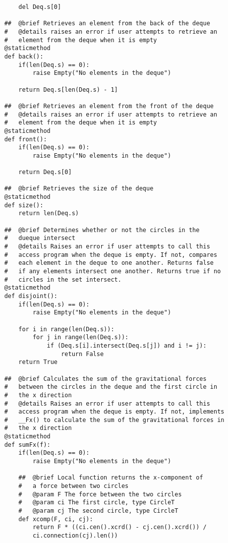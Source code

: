 \documentclass{article}
\begin{document}
\begin{lstlisting}
        del Deq.s[0]
        
    ##  @brief Retrieves an element from the back of the deque
    #   @details raises an error if user attempts to retrieve an  
    #   element from the deque when it is empty
    @staticmethod
    def back():
        if(len(Deq.s) == 0):
            raise Empty("No elements in the deque")
        
        return Deq.s[len(Deq.s) - 1]

    ##  @brief Retrieves an element from the front of the deque
    #   @details raises an error if user attempts to retrieve an  
    #   element from the deque when it is empty
    @staticmethod
    def front():
        if(len(Deq.s) == 0):
            raise Empty("No elements in the deque")
        
        return Deq.s[0]
    
    ##  @brief Retrieves the size of the deque
    @staticmethod
    def size():
        return len(Deq.s)
        
    ##  @brief Determines whether or not the circles in the 
    #   dueque intersect
    #   @details Raises an error if user attempts to call this 
    #   access program when the deque is empty. If not, compares
    #   each element in the deque to one another. Returns false 
    #   if any elements intersect one another. Returns true if no 
    #   circles in the set intersect.
    @staticmethod
    def disjoint():
        if(len(Deq.s) == 0):
            raise Empty("No elements in the deque")

        for i in range(len(Deq.s)):
            for j in range(len(Deq.s)):
                if (Deq.s[i].intersect(Deq.s[j]) and i != j):
                    return False
        return True

    ##  @brief Calculates the sum of the gravitational forces 
    #   between the circles in the deque and the first circle in 
    #   the x direction
    #   @details Raises an error if user attempts to call this 
    #   access program when the deque is empty. If not, implements 
    #   __Fx() to calculate the sum of the gravitational forces in 
    #   the x direction
    @staticmethod
    def sumFx(f):
        if(len(Deq.s) == 0):
            raise Empty("No elements in the deque")

        ##  @brief Local function returns the x-component of 
        #   a force between two circles
        #   @param F The force between the two circles
        #   @param ci The first circle, type CircleT
        #   @param cj The second circle, type CircleT
        def xcomp(F, ci, cj):
            return F * ((ci.cen().xcrd() - cj.cen().xcrd()) / 
            ci.connection(cj).len())


\end{lstlisting}
\end{document}
